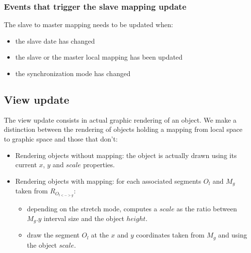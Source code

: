 \documentclass[a4paper]{article}
\begin{document}
\subsubsection{Events that trigger the slave mapping update}

The slave to master mapping needs to be updated when:
\begin{itemize}
\item the slave date has changed
\item the slave or the master local mapping has been updated
\item the synchronization mode has changed 
\end{itemize}


\subsection{View update}
The view update consists in actual graphic rendering of an object. We make a distinction between the rendering of objects holding a mapping from local space to graphic space and those that don't:

\begin{itemize}
\item Rendering objects without mapping: the object is actually drawn using its current $x$, $y$ and $scale$ properties.
\item Rendering objects with mapping: for each associated segments $O_{l}$ and  $M_{g}$ taken from $R_{O_{l<->g}}$:
\begin{itemize}
	\item depending on the stretch mode, computes a $scale$ as the ratio between $M_{g}.y$ interval size and the object $height$.
	\item draw the segment $O_{l}$ at the $x$ and $y$ coordinates taken from $M_{g}$ and using the object $scale$.
\end{itemize}

\end{itemize}





\end{document}
